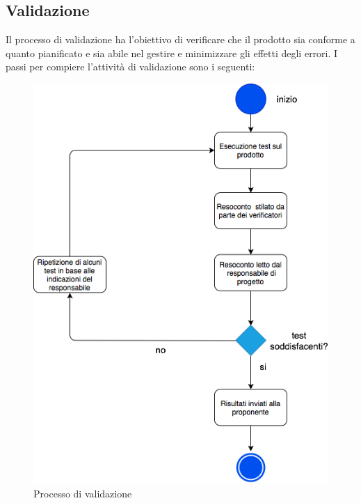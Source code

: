 \subsection{Validazione}
 Il processo di validazione ha l’obiettivo di verificare che il prodotto sia conforme a quanto pianificato e sia abile nel gestire e minimizzare gli effetti degli errori.\newline
 I passi per compiere l’attività di validazione sono i seguenti:
 \begin{figure}[!htbp]
	\centering
	\includegraphics[scale=0.5]{Validazione.png}
	\caption{Processo di validazione}
\end{figure}
 
		
	
	